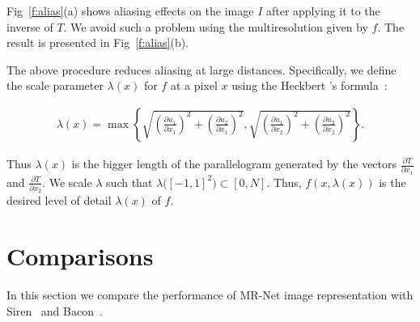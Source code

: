 Fig~\ref{f:alias}(a) shows aliasing effects on the image $I$ after applying it to the inverse of $T$. We avoid such a problem using the multiresolution given by $f$. The result is presented in Fig~\ref{f:alias}(b). 

The above procedure reduces aliasing at large distances. Specifically,
we define the scale parameter $\lambda(x)$ for $f$ at a pixel $x$ using the Heckbert 's formula~\cite{heckbert1983texture}:

\begin{align*}
    \lambda(x)=\max\left\{\sqrt{\left(\frac{\partial u_1}{\partial x_1}\right)^2+\left(\frac{\partial u_2}{\partial x_1}\right)^2}, \sqrt{\left(\frac{\partial u_1}{\partial x_2}\right)^2+\left(\frac{\partial u_2}{\partial x_2}\right)^2}\right\}.
\end{align*}

Thus $\lambda(x)$ is the bigger length of the parallelogram generated by the vectors $\frac{\partial T}{\partial x_1}$ and $\frac{\partial T}{\partial x_2}$. 
We scale $\lambda$ such that $\lambda\big([-1,1]^2\big)\subset[0,N]$.
Thus, $f(x,\lambda(x))$ is the desired level of detail $\lambda(x)$ of $f$.



\section{Comparisons}

%
%
%

In this section we compare the performance of MR-Net image representation with Siren~\cite{sitzmann2019siren} and Bacon~\cite{bacon2021}. 

